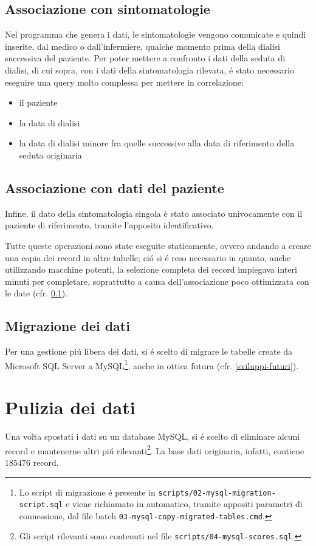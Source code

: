 \documentclass[preprint]{acm_proc_article-sp}
\begin{document}
\subsection{Associazione con sintomatologie}
\label{associazione-sintomi}
Nel programma che genera i dati, le sintomatologie vengono comunicate e quindi inserite, dal medico o dall'infermiere, qualche momento prima della dialisi successiva del paziente. 
Per poter mettere a confronto i dati della seduta di dialisi, di cui sopra, con i dati della sintomatologia rilevata, \'e stato necessario eseguire una query molto complessa per mettere in correlazione:
\begin{itemize}
\item il paziente
\item la data di dialisi
\item la data di dialisi minore fra quelle successive alla data di riferimento della seduta originaria
\end{itemize}

\subsection{Associazione con dati del paziente}
Infine, il dato della sintomatologia singola è stato associato univocamente con il paziente di riferimento, tramite l'apposito identificativo.

Tutte queste operazioni sono state eseguite staticamente, ovvero andando a creare una copia dei record in altre tabelle; ci\'o si \'e reso necessario in quanto, anche utilizzando macchine potenti, la selezione completa dei record impiegava interi minuti per completare, soprattutto a causa dell'associazione poco ottimizzata con le date (cfr. \ref{associazione-sintomi}).

\subsection{Migrazione dei dati}
Per una gestione pi\'u libera dei dati, si \'e scelto di migrare le tabelle create da Microsoft SQL Server a MySQL\footnote{Lo script di migrazione \'e presente in \texttt{scripts/02-mysql-migration-script.sql} e viene richiamato in automatico, tramite appositi parametri di connessione, dal file batch \texttt{03-mysql-copy-migrated-tables.cmd}.}, anche in ottica futura (cfr. \ref{sviluppi-futuri}).

\section{Pulizia dei dati}
\label{pulizia-dati}
Una volta spostati i dati su un database MySQL, si \'e scelto di eliminare alcuni record e mantenerne altri pi\'u rilevanti\footnote{Gli script rilevanti sono contenuti nel file \texttt{scripts/04-mysql-scores.sql}.}. La base dati originaria, infatti, contiene $185476$ record.
\end{document}
